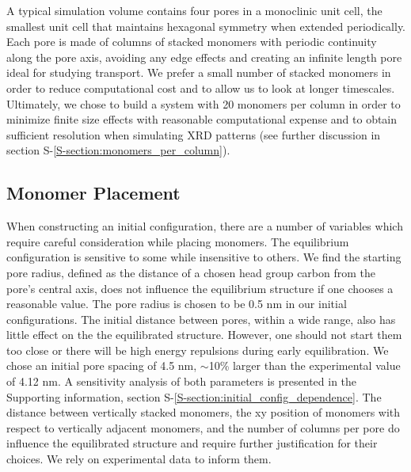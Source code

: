 \documentclass[journal=jpcbfk,manuscript=article]{achemso}
\begin{document}
  
  A typical simulation volume contains four pores in a monoclinic unit cell,
  the smallest unit cell that maintains hexagonal symmetry when extended
  periodically. Each pore is made of columns of stacked monomers with periodic
  continuity along the pore axis, avoiding any edge effects and creating an
  infinite length pore ideal for studying transport. We prefer a small number of stacked
  monomers in order to reduce computational cost and to allow us to look at
  longer timescales. Ultimately, we chose to build a system with 20 monomers
  per column in order to minimize finite size effects with reasonable computational expense 
  and to obtain sufficient resolution when simulating XRD patterns (see further discussion
  in section S-\ref{S-section:monomers_per_column}).
 
  \subsection{Monomer Placement} 

  When constructing an initial configuration, there are a number of variables
  which require careful consideration while placing monomers. The equilibrium
  configuration is sensitive to some while insensitive to others. We find the starting
  pore radius, defined as the distance of a chosen head group carbon from the
  pore's central axis, does not influence the equilibrium structure if one chooses
  a reasonable value. The pore radius is chosen to be 0.5 nm in our initial
  configurations. The initial distance between pores, within a wide range, also has 
  little effect on the the equilibrated structure. However, one should not start them
  too close or there will be high energy repulsions during early equilibration. We 
  chose an initial pore spacing of 4.5 nm, $\sim$10\% larger than the experimental value
  of 4.12 nm. A sensitivity analysis of both parameters is presented in the 
  Supporting information, section S-\ref{S-section:initial_config_dependence}. The 
  distance between vertically stacked monomers, the xy position of monomers with respect 
  to vertically adjacent monomers, and the number of columns per pore do influence the 
  equilibrated structure and require further justification for their choices. We rely on 
  experimental data to inform them. 
\end{document}
